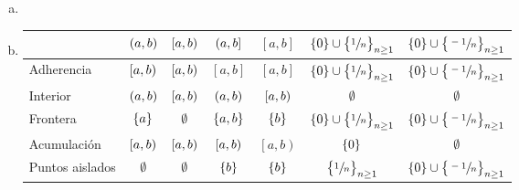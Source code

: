 \begin{eje}
\begin{enumerate}[(a)]
\begin{enumerate}[i)]
                    y por tanto $\forall x \in \left[ a, b \rp \cap \left[ c, d \rp, x \in \left[ \alpha, \beta \rp \subseteq \left[ a, b \rp \cap \left[ c, d \rp$, y $\left[ \alpha, \beta \rp \in \B$.
            \end{enumerate}
        \item \item[] %
            \begin{center}
                \begin{tabular}{|l||c|c|c|c|c|c|} \hline
                    & $\left( a, b \right)$ & $\left[ a, b \right)$ & $\left( a, b \right]$ & $\left[ a,b \right]$ & $\left\{ 0 \right\} \cup \left\{ \sfrac{1}{n} \right\}_{n\geq 1}$ & $\left\{ 0 \right\} \cup \left\{ \sfrac{-1}{n} \right\}_{n\geq 1}$ \\ \hline \hline
                    Adherencia & $\left[a,b\right)$ & $\left[ a, b \right)$ & $\left[ a, b \right]$ & $\left[ a, b \right]$ & $\left\{ 0 \right\} \cup \left\{ \sfrac{1}{n} \right\}_{n\geq 1}$ & $\left\{ 0 \right\} \cup \left\{ \sfrac{-1}{n} \right\}_{n\geq 1}$ \\ \hline
                    Interior & $\left( a, b \right)$ & $\left[ a, b \right)$ & $\left( a, b \right)$ & $\left[ a, b \right)$ & $\emptyset$ & $\emptyset$ \\ \hline
                    Frontera & $\left\{ a \right\}$ & $\emptyset$ & $\left\{ a, b \right\}$ & $\left\{ b \right\}$ & $\left\{ 0 \right\} \cup \left\{ \sfrac{1}{n} \right\}_{n\geq 1}$ & $\left\{ 0 \right\} \cup \left\{ \sfrac{-1}{n} \right\}_{n\geq 1}$ \\ \hline
                    Acumulación & $\left[a,b\right)$ & $\left[ a, b \right)$ & $\left[ a, b \right)$ & $\left[ a, b \right)$ & $\left\{ 0 \right\}$ & $\emptyset$ \\ \hline
                    Puntos aislados & $\emptyset$ & $\emptyset$ & $\left\{ b \right\}$ & $\left\{ b \right\}$ & $\left\{ \sfrac{1}{n} \right\}_{n\geq 1}$ & $\left\{ 0 \right\} \cup \left\{ \sfrac{-1}{n} \right\}_{n\geq 1}$ \\ \hline
                \end{tabular}
            \end{center}
    \end{enumerate}
\end{eje}

